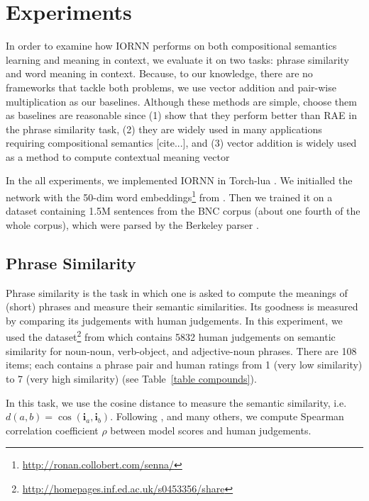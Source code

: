 \documentclass[11pt]{article}
\begin{document}

\section{Experiments}
\label{section experiments}

In order to examine how IORNN performs on both compositional semantics learning and 
meaning in context, we evaluate it on two tasks: phrase similarity and 
word meaning in context. Because, to our knowledge, there are no frameworks 
that tackle both problems, we use vector addition and pair-wise multiplication 
as our baselines. Although these methods are simple, choose them as baselines 
are reasonable since (1) \cite{blacoe_comparison_2012} show that they perform better than RAE in the 
phrase similarity task, (2) they are widely used in many applications requiring 
compositional semantics [cite...], and (3) vector addition is widely used as a method 
to compute contextual meaning vector \cite{thater2011word}

In the all experiments, we implemented IORNN in Torch-lua \cite{collobert_implementing_2012}.
We initialled the network with the 50-dim word embeddings\footnote{\url{http://ronan.collobert.com/senna/}} 
from \cite{collobert_natural_2011}. Then we trained it on a dataset containing 1.5M sentences
from the BNC corpus (about one fourth of the whole corpus), which were parsed by 
the Berkeley parser \cite{petrov2006learning}. 
	
\subsection{Phrase Similarity}
\label{subsection phrase similarity}

Phrase similarity is the task in which one is asked to compute the meanings of (short) phrases 
and measure their semantic similarities. Its goodness is measured by comparing its judgements with 
human judgements. In this experiment, we used the dataset\footnote{\url{http://homepages.inf.ed.ac.uk/s0453356/share}} from 
\cite{mitchell_composition_2010} which contains 5832 human judgements on semantic similarity 
for noun-noun, verb-object, and adjective-noun phrases. There are 108 items; each contains a phrase pair
and human ratings from 1 (very low similarity) to 7 (very high similarity) (see Table~\ref{table compounds}).

In this task, we use the cosine distance to measure the semantic similarity, 
i.e. $d(a,b) = \cos(\mathbf{i}_a,\mathbf{i}_b)$. Following \cite{blacoe_comparison_2012}, 
\cite{hermann2013role} and many others, we compute Spearman correlation coefficient $\rho$
between model scores and human judgements.
\end{document}
